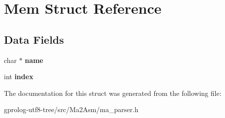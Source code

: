 \hypertarget{structMem}{}\section{Mem Struct Reference}
\label{structMem}
\subsection*{Data Fields}
\begin{DoxyCompactItemize}
\item 
char $\ast$ {\bfseries name}\hypertarget{structMem_a97d3d596dc096d506a21a183f733ef5d}{}\label{structMem_a97d3d596dc096d506a21a183f733ef5d}

\item 
int {\bfseries index}\hypertarget{structMem_a496c7609b4591655a4acf6113a892c2d}{}\label{structMem_a496c7609b4591655a4acf6113a892c2d}

\end{DoxyCompactItemize}


The documentation for this struct was generated from the following file\+:\begin{DoxyCompactItemize}
\item 
gprolog-\/utf8-\/tree/src/\+Ma2\+Asm/ma\+\_\+parser.\+h\end{DoxyCompactItemize}
